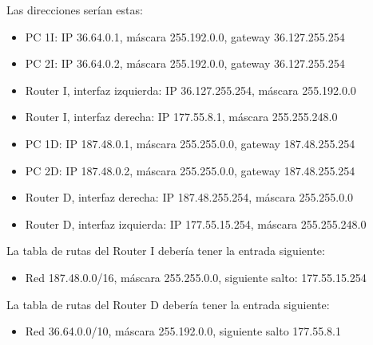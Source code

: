 \documentclass[letterpaper,10pt,spanish]{sphinxmanual}
\begin{document}
\sphinxAtStartPar
Las direcciones serían estas:
\begin{itemize}
\item {} 
\sphinxAtStartPar
PC 1I: IP 36.64.0.1, máscara 255.192.0.0, gateway 36.127.255.254

\item {} 
\sphinxAtStartPar
PC 2I: IP 36.64.0.2, máscara 255.192.0.0, gateway 36.127.255.254

\item {} 
\sphinxAtStartPar
Router I, interfaz izquierda: IP 36.127.255.254, máscara 255.192.0.0

\item {} 
\sphinxAtStartPar
Router I, interfaz derecha: IP 177.55.8.1, máscara 255.255.248.0

\item {} 
\sphinxAtStartPar
PC 1D: IP 187.48.0.1, máscara 255.255.0.0, gateway 187.48.255.254

\item {} 
\sphinxAtStartPar
PC 2D: IP 187.48.0.2, máscara 255.255.0.0, gateway 187.48.255.254

\item {} 
\sphinxAtStartPar
Router D, interfaz derecha: IP 187.48.255.254, máscara 255.255.0.0

\item {} 
\sphinxAtStartPar
Router D, interfaz izquierda: IP 177.55.15.254, máscara 255.255.248.0

\end{itemize}

\sphinxAtStartPar
La tabla de rutas del Router I debería tener la entrada siguiente:
\begin{itemize}
\item {} 
\sphinxAtStartPar
Red 187.48.0.0/16, máscara 255.255.0.0, siguiente salto: 177.55.15.254

\end{itemize}

\sphinxAtStartPar
La tabla de rutas del Router D debería tener la entrada siguiente:
\begin{itemize}
\item {} 
\sphinxAtStartPar
Red 36.64.0.0/10, máscara 255.192.0.0, siguiente salto 177.55.8.1

\end{itemize}
\end{document}
